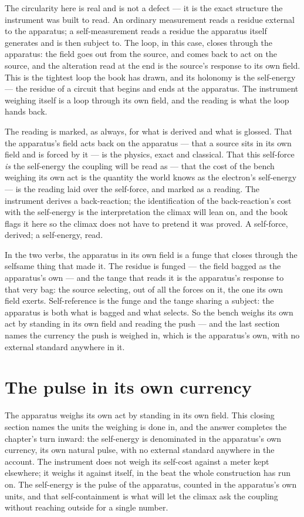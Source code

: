 The circularity here is real and is not a defect --- it is the exact structure the instrument was built to read. An ordinary
measurement reads a residue external to the apparatus; a self-measurement reads a residue the apparatus itself generates and
is then subject to. The loop, in this case, closes through the apparatus: the field goes out from the source, and comes back
to act on the source, and the alteration read at the end is the source's response to its own field. This is the tightest loop
the book has drawn, and its holonomy is the self-energy --- the residue of a circuit that begins and ends at the apparatus.
The instrument weighing itself is a loop through its own field, and the reading is what the loop hands back.

The reading is marked, as always, for what is derived and what is glossed. That the apparatus's field acts back on the
apparatus --- that a source sits in its own field and is forced by it --- is the physics, exact and classical. That this
self-force \emph{is} the self-energy the coupling will be read as --- that the cost of the bench weighing its own act is the
quantity the world knows as the electron's self-energy --- is the reading laid over the self-force, and marked as a reading.
The instrument derives a back-reaction; the identification of the back-reaction's cost with the self-energy is the
interpretation the climax will lean on, and the book flags it here so the climax does not have to pretend it was proved. A
self-force, derived; a self-energy, read.

In the two verbs, the apparatus in its own field is a funge that closes through the selfsame thing that made it. The residue
is funged --- the field bagged as the apparatus's own --- and the tange that reads it is the apparatus's response to that
very bag: the source selecting, out of all the forces on it, the one its own field exerts. Self-reference is the funge and
the tange sharing a subject: the apparatus is both what is bagged and what selects. So the bench weighs its own act by
standing in its own field and reading the push --- and the last section names the currency the push is weighed in, which is
the apparatus's own, with no external standard anywhere in it.

\section{The pulse in its own currency}

The apparatus weighs its own act by standing in its own field. This closing section names the units the weighing is done in,
and the answer completes the chapter's turn inward: the self-energy is denominated in the apparatus's own currency, its own
natural pulse, with no external standard anywhere in the account. The instrument does not weigh its self-cost against a meter
kept elsewhere; it weighs it against itself, in the beat the whole construction has run on. The self-energy is the pulse of
the apparatus, counted in the apparatus's own units, and that self-containment is what will let the climax ask the coupling
without reaching outside for a single number.


